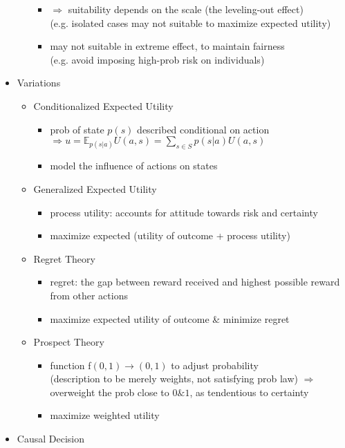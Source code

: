 \begin{itemize}
\begin{itemize}
\begin{itemize}
		\item $\Rightarrow$ suitability depends on the scale (the leveling-out effect) \\ 
		(e.g. isolated cases may not suitable to maximize expected utility)
		\item may not suitable in extreme effect, to maintain fairness \\
		(e.g. avoid imposing high-prob risk on individuals)
		\end{itemize}
	\end{itemize}
\item Variations
	\begin{itemize}
	\item Conditionalized Expected Utility
		\begin{itemize}
		\item prob of state $p(s)$ described conditional on action \\
		$\displaystyle \Rightarrow u = \mathbb E_{p(s|a)} U(a,s) = \sum_{s\in S} p(s|a)U(a,s)$
		\item model the influence of actions on states
		\end{itemize}
	\item Generalized Expected Utility
		\begin{itemize}
		\item process utility: accounts for attitude towards risk and certainty
		\item maximize expected (utility of outcome + process utility)
		\end{itemize}
	\item Regret Theory
		\begin{itemize}
		\item regret: the gap between reward received and highest possible reward from other actions
		\item maximize expected utility of outcome \& minimize regret
		\end{itemize}
	\item Prospect Theory
		\begin{itemize}
		\item function f$(0,1)\rightarrow(0,1)$ to adjust probability \\
		(description to be merely weights, not satisfying prob law)
		$\Rightarrow$ overweight the prob close to $0\&1$, as tendentious to certainty
		\item maximize weighted utility
		\end{itemize}
	\end{itemize}
\item Causal Decision
\end{itemize}
